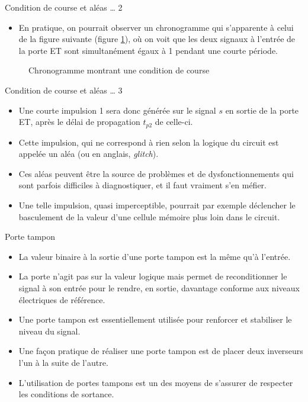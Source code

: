 \documentclass[presentation]{beamer}
\begin{document}
\begin{frame}[label={sec:org0e7e9b3}]{Condition de course et aléas \ldots{} 2}
\begin{itemize}
\item En pratique, on pourrait observer un chronogramme qui s'apparente à celui de la figure suivante (figure \ref{fig:orgbf26aa3}), où on voit que les deux signaux à l'entrée de la porte ET sont simultanément égaux à 1 pendant une courte période.
\end{itemize}


\begin{figure}[htbp]
\centering

\caption{\label{fig:orgbf26aa3}Chronogramme montrant une condition de course}
\end{figure}
\end{frame}
\begin{frame}[label={sec:org054fbe0}]{Condition de course et aléas \ldots{} 3}
\begin{itemize}
\item Une courte impulsion 1 sera donc générée sur le signal \(s\) en sortie de la porte ET, après le délai de propagation \(t_{p2}\) de celle-ci.

\item Cette impulsion, qui ne correspond à rien selon la logique du circuit est appelée un \alert{aléa} (ou en anglais, \emph{glitch}).

\item Ces aléas peuvent être la source de problèmes et de dysfonctionnements qui sont parfois difficiles à diagnostiquer, et il faut vraiment s'en méfier.

\item Une telle impulsion, quasi imperceptible, pourrait par exemple déclencher le basculement de la valeur d'une cellule mémoire plus loin dans le circuit.
\end{itemize}
\end{frame}

\begin{frame}[label={sec:orgc16118c}]{Porte tampon}
\begin{itemize}
\item La valeur binaire à la sortie d'une porte tampon est la même qu'à l'entrée.

\item La porte n'agit pas sur la valeur logique mais permet de reconditionner le signal à son entrée pour le rendre, en sortie, davantage conforme aux niveaux électriques de référence.

\item Une porte tampon est essentiellement utilisée pour renforcer et stabiliser le niveau du signal.

\item Une façon pratique de réaliser une porte tampon est de placer deux inverseurs l'un à la suite de l'autre.

\item L'utilisation de portes tampons est un des moyens de s'assurer de respecter les conditions de sortance.
\end{itemize}
\end{frame}
\end{document}
